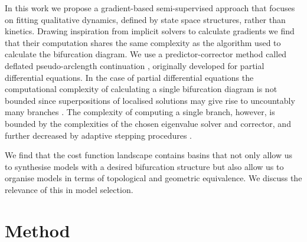 In this work we propose a gradient-based semi-supervised approach that focuses on fitting qualitative dynamics, defined by state space structures, rather than kinetics. Drawing inspiration from implicit solvers \cite{Look2020DifferentiableLayers,Bai2019DeepModels} to calculate gradients we find that their computation shares the same  complexity as the algorithm used to calculate the bifurcation diagram. We use a predictor-corrector method called deflated pseudo-arclength continuation \cite{Farrell2016TheDiagrams,Veltz2019PseudoArcLengthContinuation.jl}, originally developed for partial differential equations. In the case of partial differential equations the computational complexity of calculating a single bifurcation diagram is not bounded since superpositions of localised solutions may give rise to uncountably many branches \cite{Avitabile2010ToEquation}. The complexity of computing a single branch, however, is bounded by the complexities of the chosen eigenvalue solver and corrector, and further decreased by adaptive stepping procedures \cite{Aruliah2016AlgorithmContinuation}.

We find that the cost function landscape contains basins that not only allow us to synthesise models with a desired bifurcation structure but also allow us to organise models in terms of topological and geometric equivalence. We discuss the relevance of this in model selection.


\clearpage
\section{Method}

